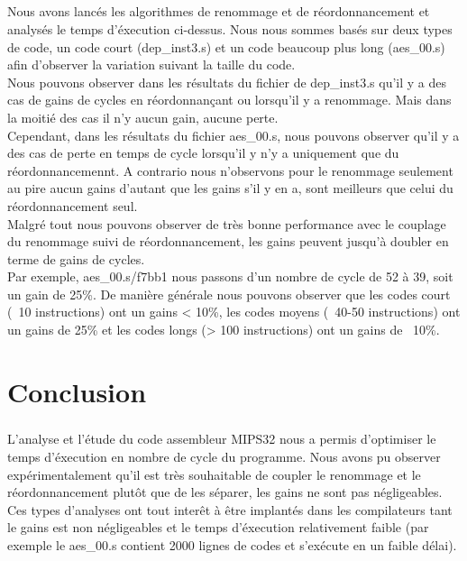 \documentclass[a4paper,12pt]{report}
\begin{document}
\paragraph*{}
Nous avons lancés les algorithmes de renommage et de réordonnancement et analysés le temps d'éxecution ci-dessus. Nous nous sommes basés sur deux types de code, un code court (dep\_inst3.s) et un code beaucoup plus long (aes\_00.s) afin d'observer la variation suivant la taille du code. \\

Nous pouvons observer dans les résultats du fichier de dep\_inst3.s qu'il y a des cas de gains de cycles en réordonnançant ou lorsqu'il y a renommage. Mais dans la moitié des cas il n'y aucun gain, aucune perte. \\
Cependant, dans les résultats du fichier aes\_00.s, nous pouvons observer qu'il y a des cas de perte en temps de cycle lorsqu'il y n'y a uniquement que du réordonnancemennt. A contrario nous n'observons pour le renommage seulement au pire aucun gains d'autant que les gains s'il y en a, sont meilleurs que celui du réordonnancement seul. \\
Malgré tout nous pouvons observer de très bonne performance avec le couplage du renommage suivi de réordonnancement, les gains peuvent jusqu'à doubler en terme de gains de cycles. \\
Par exemple, aes\_00.s/f7bb1 nous passons d'un nombre de cycle de 52 à 39, soit un gain de 25\%.
De manière générale nous pouvons observer que les codes court (~10 instructions) ont un gains < 10\%, les codes moyens (~40-50 instructions) ont un gains de 25\% et les codes longs (> 100 instructions) ont un gains de ~10\%.
\chapter{Conclusion}
\paragraph*{}
L'analyse et l'étude du code assembleur MIPS32 nous a permis d'optimiser le temps d'éxecution en nombre de cycle du programme. Nous avons pu observer expérimentalement qu'il est très souhaitable de coupler le renommage et le réordonnancement plutôt que de les séparer, les gains ne sont pas négligeables.
Ces types d'analyses ont tout interêt à être implantés dans les compilateurs tant le gains est non négligeables et le temps d'éxecution relativement faible (par exemple le aes\_00.s contient 2000 lignes de codes et s'exécute en un faible délai).
\end{document}
